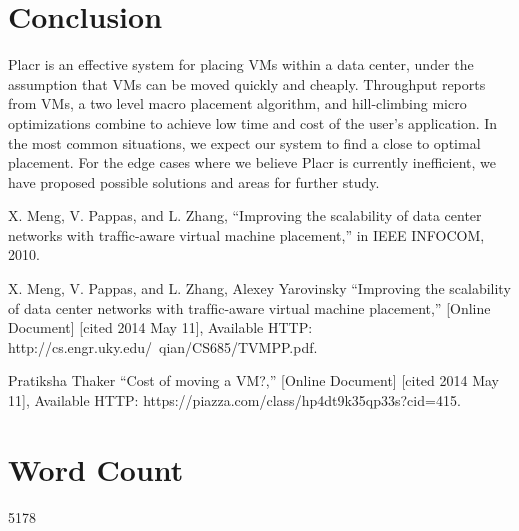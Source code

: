 \documentclass[11pt]{article}
\begin{document}
\section{Conclusion}

Placr is an effective system for placing VMs within a data center, under the assumption that VMs can be moved quickly and cheaply.  Throughput reports from VMs, a two level macro placement algorithm, and hill-climbing micro optimizations combine to achieve low time and cost of the user's application.  In the most common situations, we expect our system to find a close to optimal placement. For the edge cases where we believe Placr is currently inefficient, we have proposed possible solutions and areas for further study.



\begin{thebibliography}{9}

  X. Meng, V. Pappas, and L. Zhang, ``Improving the scalability of data
center networks with trafﬁc-aware virtual machine placement,'' in IEEE
INFOCOM, 2010.

X. Meng, V. Pappas, and L. Zhang, Alexey Yarovinsky ``Improving the scalability of data
center networks with trafﬁc-aware virtual machine placement,'' [Online Document] [cited 2014 May 11], Available HTTP: http://cs.engr.uky.edu/~qian/CS685/TVMPP.pdf.

 Pratiksha Thaker ``Cost of moving a VM?,'' [Online Document] [cited 2014 May 11], Available HTTP: https://piazza.com/class/hp4dt9k35qp33s?cid=415.

\end{thebibliography}

\section*{Word Count}
5178
\end{document}

